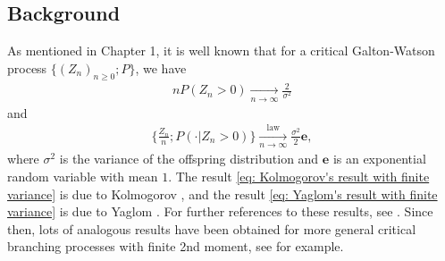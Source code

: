 \documentclass[UTF8]{pkuthss}
\theoremstyle{plain}
\theoremstyle{definition}
\numberwithin{equation}{section}
\begin{document}
\subsection{Background}
	As mentioned in Chapter 1, it is well known that for a critical Galton-Watson process $\{(Z_n)_{n\geq 0}; P\}$, we have
\begin{align}\label{eq: Kolmogorov's result with finite variance}
	n P(Z_n > 0)
	\xrightarrow[n\to \infty]{} \frac{2}{\sigma^2}
\end{align}
	and
\begin{align}\label{eq: Yaglom's result with finite variance}
	\Big\{ \frac{Z_n}{n}; P(\cdot| Z_n > 0) \Big\}
	\xrightarrow[n \to \infty]{\operatorname{law}} \frac{\sigma^2}{2} \mathbf e,
\end{align}
	where $\sigma^2$ is the variance of the offspring distribution and $\mathbf e$ is an exponential random variable with mean $1$.
	The result \eqref{eq: Kolmogorov's result with finite variance} is due to Kolmogorov \cite{Kolmogorov1938Zur}, and the result \eqref{eq: Yaglom's result with finite variance} is due to Yaglom \cite{Yaglom1947Certain}.
	For further references to these results, see 
	\cite{Harris2002Theory, KestenNeySpitzer1966GaltonWatson}.
	Since then, lots of analogous results have been obtained for more general
	critical branching processes with finite 2nd moment, 
	see \cite{AsmussenHering1983Branching, AthreyaNey1974Functionals, AthreyaNey1972Branching, JoffeSpitzer1967Multitype} for example.
	
\end{document}
